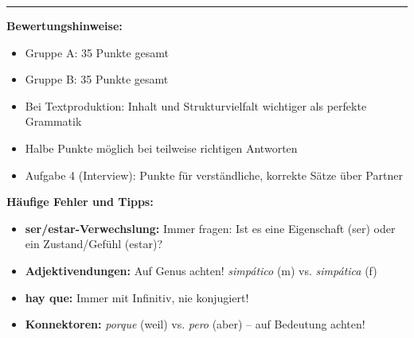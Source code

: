 \documentclass[11pt,a4paper]{article}
\newcommand{\es}[1]{\textit{#1}}
\begin{document}
\vspace{1em}
\hrule
\vspace{0.3em}

\textbf{Bewertungshinweise:}
\begin{itemize}[leftmargin=1.5em, nosep]
    \item Gruppe A: 35 Punkte gesamt
    \item Gruppe B: 35 Punkte gesamt
    \item Bei Textproduktion: Inhalt und Strukturvielfalt wichtiger als perfekte Grammatik
    \item Halbe Punkte möglich bei teilweise richtigen Antworten
    \item Aufgabe 4 (Interview): Punkte für verständliche, korrekte Sätze über Partner
\end{itemize}

\vspace{1em}

\textbf{Häufige Fehler und Tipps:}
\begin{itemize}[leftmargin=1.5em, nosep]
    \item \textbf{ser/estar-Verwechslung:} Immer fragen: Ist es eine Eigenschaft (ser) oder ein Zustand/Gefühl (estar)?
    \item \textbf{Adjektivendungen:} Auf Genus achten! \es{simpático} (m) vs. \es{simpática} (f)
    \item \textbf{hay que:} Immer mit Infinitiv, nie konjugiert!
    \item \textbf{Konnektoren:} \es{porque} (weil) vs. \es{pero} (aber) -- auf Bedeutung achten!
\end{itemize}
\end{document}
